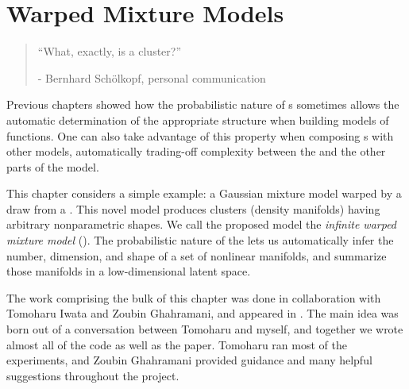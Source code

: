 
\inbpdocument

\chapter{Warped Mixture Models}
\label{ch:warped}

\begin{quotation}
``What, exactly, is a cluster?''

\hspace*{\fill} - Bernhard Sch\"{o}lkopf, personal communication
\end{quotation}

Previous chapters showed how the probabilistic nature of \gp{}s sometimes allows the automatic determination of the appropriate structure when building models of functions.
One can also take advantage of this property when composing \gp{}s with other models, automatically trading-off complexity between the \gp{} and the other parts of the model.

This chapter considers a simple example: a Gaussian mixture model warped by a draw from a \gp{}.
This novel model produces clusters (density manifolds) having arbitrary nonparametric shapes.
We call the proposed model the \emph{infinite warped mixture model} (\iwmm{}).
The probabilistic nature of the \iwmm{} lets us automatically infer the number, dimension, and shape of a set of nonlinear manifolds, and summarize those manifolds in a low-dimensional latent space.





The work comprising the bulk of this chapter was done in collaboration with Tomoharu Iwata and Zoubin Ghahramani, and appeared in \citet{IwaDuvGha12}.
The main idea was born out of a conversation between Tomoharu and myself, and together we wrote almost all of the code as well as the paper.
Tomoharu ran most of the experiments, and Zoubin Ghahramani provided guidance and many helpful suggestions throughout the project.




